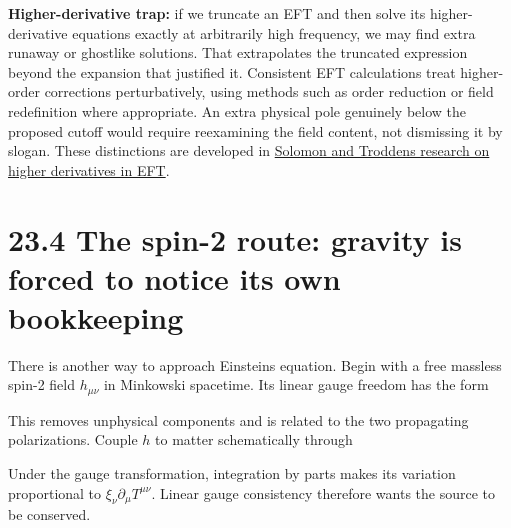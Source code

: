\documentclass[
  11pt,
  letterpaper,
  oneside,
  openany]{scrbook}
\begin{document}
\textbf{Higher-derivative trap:} if we truncate an EFT and then solve
its higher-derivative equations exactly at arbitrarily high frequency,
we may find extra runaway or ghostlike solutions. That extrapolates the
truncated expression beyond the expansion that justified it. Consistent
EFT calculations treat higher-order corrections perturbatively, using
methods such as order reduction or field redefinition where appropriate.
An extra physical pole genuinely below the proposed cutoff would require
reexamining the field content, not dismissing it by slogan. These
distinctions are developed in
\href{https://arxiv.org/abs/1709.09695}{Solomon and
Trodden\textquotesingle s research on higher derivatives in EFT}.

\hypertarget{the-spin-2-route-gravity-is-forced-to-notice-its-own-bookkeeping}{%
\section{23.4 The spin-2 route: gravity is forced to notice its own
bookkeeping}\label{the-spin-2-route-gravity-is-forced-to-notice-its-own-bookkeeping}}

There is another way to approach Einstein\textquotesingle s equation.
Begin with a free massless spin-2 field \(h_{\mu\nu}\) in Minkowski
spacetime. Its linear gauge freedom has the form

\begin{center}
\begingroup
{}
\ifdim\wd\grmathbox>\linewidth
\resizebox{\linewidth}{!}{\usebox{\grmathbox}}
\else\usebox{\grmathbox}\fi
\endgroup
\end{center}

This removes unphysical components and is related to the two propagating
polarizations. Couple \(h\) to matter schematically through

\begin{center}
\begingroup
{}
\ifdim\wd\grmathbox>\linewidth
\resizebox{\linewidth}{!}{\usebox{\grmathbox}}
\else\usebox{\grmathbox}\fi
\endgroup
\end{center}

Under the gauge transformation, integration by parts makes its variation
proportional to \(\xi_\nu\partial_\mu T^{\mu\nu}\). Linear gauge
consistency therefore wants the source to be conserved.
\end{document}
